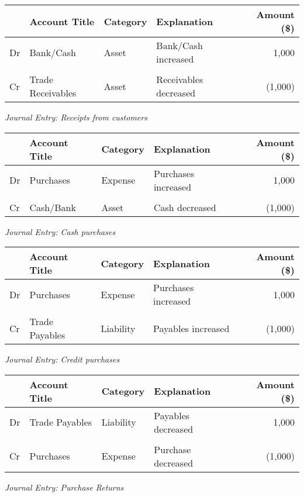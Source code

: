 \begin{center} 
\begin{tabular}{@{} l l l l r @{}}
\toprule
& \textbf{Account Title} & \textbf{Category} & \textbf{Explanation} & \textbf{Amount (\$)} \\
\midrule
Dr & Bank/Cash & Asset & Bank/Cash increased & 1,000 \\
 & \quad  & \\
Cr & Trade Receivables & Asset & Receivables decreased & (1,000) \\
\bottomrule
\end{tabular}
\end{center}
\vspace{1em}
\textit{Journal Entry: Receipts from customers}


\begin{center} 
\begin{tabular}{@{} l l l l r @{}}
\toprule
& \textbf{Account Title} & \textbf{Category} & \textbf{Explanation} & \textbf{Amount (\$)} \\
\midrule
Dr & Purchases & Expense & Purchases increased & 1,000 \\
 & \quad  & \\
Cr & Cash/Bank & Asset & Cash decreased & (1,000) \\
\bottomrule
\end{tabular}
\end{center}
\vspace{1em}
\textit{Journal Entry: Cash purchases}


\begin{center} 
\begin{tabular}{@{} l l l l r @{}}
\toprule
& \textbf{Account Title} & \textbf{Category} & \textbf{Explanation} & \textbf{Amount (\$)} \\
\midrule
Dr & Purchases & Expense & Purchases increased & 1,000 \\
 & \quad  & \\
Cr & Trade Payables & Liability & Payables increased & (1,000) \\
\bottomrule
\end{tabular}
\end{center}
\vspace{1em}
\textit{Journal Entry: Credit purchases}


\begin{center} 
\begin{tabular}{@{} l l l l r @{}}
\toprule
& \textbf{Account Title} & \textbf{Category} & \textbf{Explanation} & \textbf{Amount (\$)} \\
\midrule
Dr & Trade Payables & Liability & Payables decreased & 1,000 \\
 & \quad  & \\
Cr & Purchases & Expense & Purchase decreased & (1,000) \\
\bottomrule
\end{tabular}
\end{center}
\vspace{1em}
\textit{Journal Entry: Purchase Returns}

